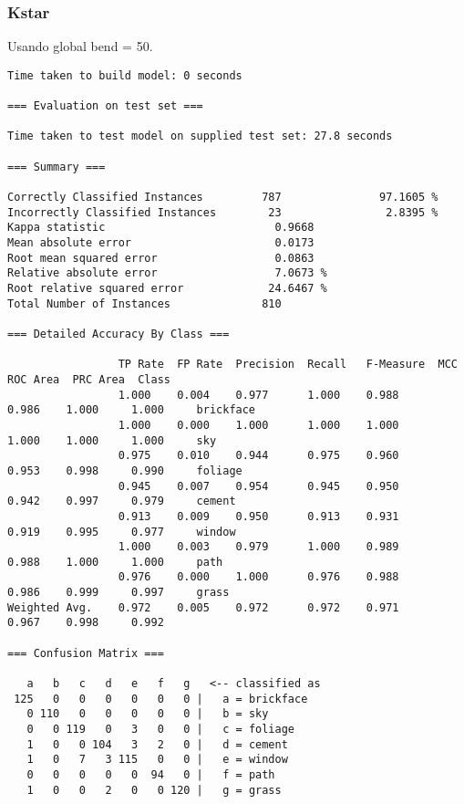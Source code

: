 \documentclass[a4paper]{article}
\begin{document}
\subsubsection {Kstar}
Usando global bend = 50.
\begin{verbatim}
Time taken to build model: 0 seconds

=== Evaluation on test set ===

Time taken to test model on supplied test set: 27.8 seconds

=== Summary ===

Correctly Classified Instances         787               97.1605 %
Incorrectly Classified Instances        23                2.8395 %
Kappa statistic                          0.9668
Mean absolute error                      0.0173
Root mean squared error                  0.0863
Relative absolute error                  7.0673 %
Root relative squared error             24.6467 %
Total Number of Instances              810

=== Detailed Accuracy By Class ===

                 TP Rate  FP Rate  Precision  Recall   F-Measure  MCC      ROC Area  PRC Area  Class
                 1.000    0.004    0.977      1.000    0.988      0.986    1.000     1.000     brickface
                 1.000    0.000    1.000      1.000    1.000      1.000    1.000     1.000     sky
                 0.975    0.010    0.944      0.975    0.960      0.953    0.998     0.990     foliage
                 0.945    0.007    0.954      0.945    0.950      0.942    0.997     0.979     cement
                 0.913    0.009    0.950      0.913    0.931      0.919    0.995     0.977     window
                 1.000    0.003    0.979      1.000    0.989      0.988    1.000     1.000     path
                 0.976    0.000    1.000      0.976    0.988      0.986    0.999     0.997     grass
Weighted Avg.    0.972    0.005    0.972      0.972    0.971      0.967    0.998     0.992

=== Confusion Matrix ===

   a   b   c   d   e   f   g   <-- classified as
 125   0   0   0   0   0   0 |   a = brickface
   0 110   0   0   0   0   0 |   b = sky
   0   0 119   0   3   0   0 |   c = foliage
   1   0   0 104   3   2   0 |   d = cement
   1   0   7   3 115   0   0 |   e = window
   0   0   0   0   0  94   0 |   f = path
   1   0   0   2   0   0 120 |   g = grass

\end{verbatim}
\end{document}
